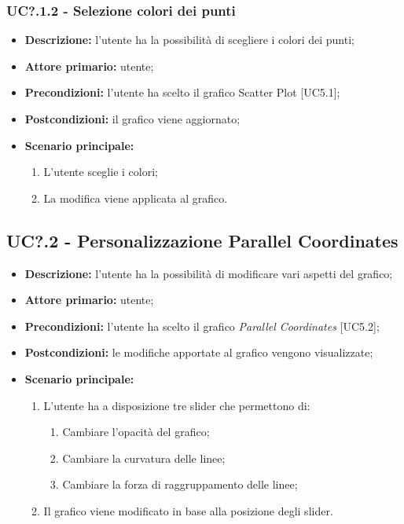   \subsubsection{UC?.1.2 - Selezione colori dei punti}
  \begin{itemize}
    \item \textbf{Descrizione:} l'utente ha la possibilità di scegliere i colori dei punti;
    \item \textbf{Attore primario:} utente;
    \item \textbf{Precondizioni:} l’utente ha scelto il grafico Scatter Plot [UC5.1];
    \item \textbf{Postcondizioni:} il grafico viene aggiornato;
    \item \textbf{Scenario principale:}
      \begin{enumerate}
      \item L'utente sceglie i colori;
      \item La modifica viene applicata al grafico.
    \end{enumerate}
  \end{itemize}

\subsection{UC?.2 - Personalizzazione Parallel Coordinates}
\begin{itemize}
    \item \textbf{Descrizione:} l'utente ha la possibilità di modificare vari aspetti del grafico;
    \item \textbf{Attore primario:} utente;
    \item \textbf{Precondizioni:} l’utente ha scelto il grafico \textit{Parallel Coordinates} [UC5.2];
    \item \textbf{Postcondizioni:} le modifiche apportate al grafico vengono visualizzate;
    \item \textbf{Scenario principale:}
    \begin{enumerate}
      \item L'utente ha a disposizione tre slider che permettono di:
    \begin{enumerate}
      \item Cambiare l'opacità del grafico;
      \item Cambiare la curvatura delle linee;
      \item Cambiare la forza di raggruppamento delle linee;
    \end{enumerate}
    \item Il grafico viene modificato in base alla posizione degli slider.
  \end{enumerate}
  \end{itemize}


